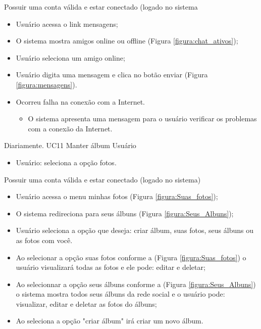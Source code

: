  {Possuir uma conta válida e estar conectado (logado no sistema}
{}
{
\begin{itemize}
	\item Usuário acessa o link mensagens;
	\item O sistema mostra amigos online ou offline (Figura \ref{figura:chat_ativos});
	\item Usuário seleciona um amigo online;
	\item Usuário digita uma mensagem e clica no botão enviar (Figura \ref{figura:mensagens}).
\end{itemize}
}
{
\begin{itemize}
	\item Ocorreu falha na conexão com a Internet.
	\begin{itemize}
	\item O sistema apresenta uma mensagem para o usuário verificar os problemas com a conexão da Internet.
	\end{itemize}
\end{itemize}
}
{Diariamente.}
{
}
\casoDeUso
{UC11}
{Manter álbum}
{Usuário}
{
\begin{itemize}
	\item Usuário: seleciona a opção fotos.
	
\end{itemize}

}
 {Possuir uma conta válida e estar conectado (logado no sistema)}
{}
{
\begin{itemize}
	\item Usuário acessa o menu minhas fotos (Figura \ref{figura:Suas_fotos});
	\item O sistema redireciona para seus álbuns (Figura \ref{figura:Seus_Albuns});
	\item Usuário seleciona a opção que deseja: criar álbum, suas fotos, seus álbuns ou as fotos com você.
	
\end{itemize}
}
{
\begin{itemize}
	\item Ao selecionar a opção suas fotos conforme a (Figura \ref{figura:Suas_fotos}) o usuário visualizará todas as fotos e ele pode: editar e deletar;
	\item Ao selecionnar a opção seus álbuns conforme a (Figura \ref{figura:Seus_Albuns}) o sistema mostra todos seus álbuns da rede social e o usuário pode: visualizar, editar e deletar as fotos do álbuns;
	\item Ao seleciona a opção "criar álbum" irá criar um novo álbum.
	
\end{itemize}
}
